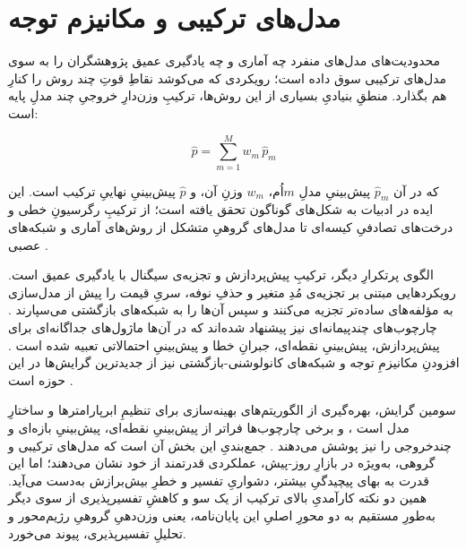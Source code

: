 \section{مدل‌های ترکیبی و مکانیزم توجه}

محدودیت‌های مدل‌های منفرد  چه آماری و چه یادگیری عمیق  پژوهشگران را
به سوی مدل‌های ترکیبی سوق داده است؛ رویکردی که می‌کوشد نقاطِ قوتِ چند روش را
کنارِ هم بگذارد. منطقِ بنیادیِ بسیاری از این روش‌ها، ترکیبِ وزن‌دارِ خروجیِ چند
مدلِ پایه است:

\begin{equation}
\hat{p} = \sum_{m=1}^{M} w_m\,\hat{p}_m
\end{equation}

که در آن $\hat{p}_m$ پیش‌بینیِ مدلِ $m$‌اُم، $w_m$ وزنِ آن، و $\hat{p}$ پیش‌بینیِ
نهاییِ ترکیب است. این ایده در ادبیات به شکل‌های گوناگون تحقق یافته است؛ از ترکیبِ
رگرسیونِ خطی و درخت‌های تصادفیِ کیسه‌ای \cite{alkawaz_day-ahead_2022} تا مدل‌های
گروهیِ متشکل از روش‌های آماری و شبکه‌های عصبی \cite{shah_short-term_2021}.

الگوی پرتکرارِ دیگر، ترکیبِ پیش‌پردازش و تجزیه‌ی سیگنال با یادگیری عمیق است.
رویکردهایی مبتنی بر تجزیه‌ی مُدِ متغیر و حذفِ نوفه، سریِ قیمت را پیش از مدل‌سازی
به مؤلفه‌های ساده‌تر تجزیه می‌کنند و سپس آن‌ها را به شبکه‌های بازگشتی می‌سپارند
\cite{yang_novel_2022, moradzadeh_hybrid_2025}. چارچوب‌های چندپیمانه‌ای نیز
پیشنهاد شده‌اند که در آن‌ها ماژول‌های جداگانه‌ای برای پیش‌پردازش، پیش‌بینیِ
نقطه‌ای، جبرانِ خطا و پیش‌بینیِ احتمالاتی تعبیه شده است
\cite{zhang_deep_2020, ghimire_two-step_2024}. افزودنِ مکانیزمِ توجه و شبکه‌های
کانولوشنی-بازگشتی نیز از جدیدترین گرایش‌ها در این حوزه است
\cite{pourdaryaei_new_2024, mubarak_day-ahead_2024, kuo_electricity_2018}.

سومین گرایش، بهره‌گیری از الگوریتم‌های بهینه‌سازی برای تنظیمِ ابرپارامترها و
ساختارِ مدل است \cite{sun_day-ahead_2022}، و برخی چارچوب‌ها فراتر از پیش‌بینیِ
نقطه‌ای، پیش‌بینیِ بازه‌ای و چندخروجی را نیز پوشش می‌دهند
\cite{jiang_multivariable_2023}. جمع‌بندیِ این بخش آن است که مدل‌های ترکیبی و
گروهی، به‌ویژه در بازارِ روز-پیش، عملکردی قدرتمند از خود نشان می‌دهند؛ اما این
قدرت به بهای پیچیدگیِ بیشتر، دشواریِ تفسیر و خطرِ بیش‌برازش به‌دست می‌آید. همین دو
نکته  کارآمدیِ بالای ترکیب از یک سو و کاهشِ تفسیرپذیری از سوی دیگر 
به‌طورِ مستقیم به دو محورِ اصلیِ این پایان‌نامه، یعنی وزن‌دهیِ گروهیِ رژیم‌محور و
تحلیلِ تفسیرپذیری، پیوند می‌خورد.
